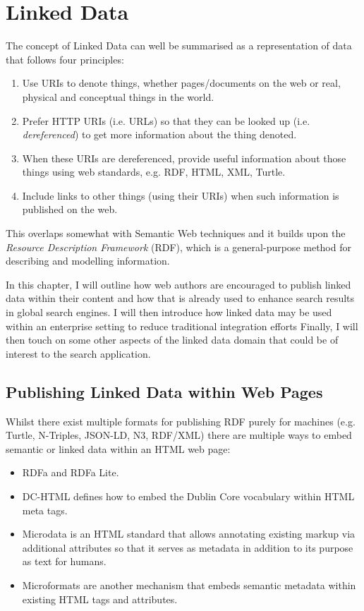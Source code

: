 \chapter{Linked Data}
\label{stateoftheart}

The concept of Linked Data can well be summarised as a representation of
data that follows four principles:\cite{berners2011linked}

\begin{enumerate}
\item Use URIs to denote things, whether pages/documents on the web
  or real, physical and conceptual things in the world.
\item Prefer HTTP URIs (i.e. URLs) so that they can be looked
  up (i.e. \emph{dereferenced}) to get more information about the thing denoted.
\item When these URIs are dereferenced, provide useful information about
  those things using web standards, e.g. RDF, HTML, XML, Turtle.
\item Include links to other things (using their URIs) when such
  information is published on the web.
\end{enumerate}

This overlaps somewhat with Semantic Web techniques and it builds upon
the \emph{Resource Description Framework} (RDF)\cite{lassila1999resource},
which is a general-purpose method for describing and modelling information.

In this chapter, I will outline how web authors are encouraged to publish
linked data within their content and how that is already used to enhance
search results in global search engines. I will then introduce how linked
data may be used within an enterprise setting to reduce traditional
integration efforts Finally, I will then touch on some other aspects of the linked
data domain that could be of interest to the search application.

\section{Publishing Linked Data within Web Pages}
\label{publishing-linked-data}

Whilst there exist multiple formats for publishing RDF purely for machines
(e.g. Turtle\cite{world2014rdf}, N-Triples, JSON-LD\cite{world2014json},
N3, RDF/XML) there are multiple ways to embed semantic or linked data within
an HTML web page:

\begin{itemize}
  \item RDFa\cite{adida2012rdfa} and RDFa Lite\cite{lite2004rdfa}.
  \item DC-HTML defines how to embed the Dublin Core vocabulary within HTML
    meta tags.\cite{johnston2008expressing}
  \item Microdata\cite{htmlstandard} is an HTML standard that allows
    annotating existing markup
    via additional attributes so that it serves as metadata in addition to
    its purpose as text for humans.
  \item Microformats are another mechanism that embeds semantic metadata
    within existing HTML tags and attributes.
\end{itemize}

